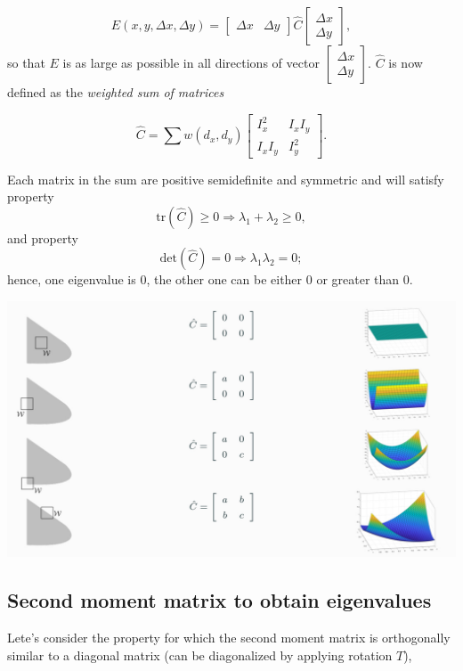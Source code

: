 \documentclass[10pt]{report}
\begin{document}
\[E(x, y, \Delta x, \Delta y) = \begin{bmatrix} \Delta x & \Delta y \end{bmatrix} \hat{C} \begin{bmatrix} \Delta x \\ \Delta y \end{bmatrix},\]
so that \(E\) is as large as possible in all directions of vector
\(\begin{bmatrix} \Delta x \\ \Delta y \end{bmatrix}\). \(\hat{C}\) is
now defined as the \emph{weighted sum of matrices}

\[\hat{C} = \sum w(d_x, d_y) \begin{bmatrix} I^2_x & I_x I_y \\ I_x I_y & I^2_y \end{bmatrix}.\]

Each matrix in the sum are positive semidefinite and symmetric and will
satisfy property
\[\mbox{tr}(\hat C) \geq 0 \Rightarrow \lambda_1 + \lambda_2 \geq 0,\]
and property
\[\mbox{det}(\hat C) = 0 \Rightarrow \lambda_1 \lambda_2 = 0;\] hence,
one eigenvalue is \(0\), the other one can be either \(0\) or greater
than \(0\).

\begin{center}
\includegraphics[width=.9\linewidth]{./pics/det/second-moment-matrix-plots.jpg}
\end{center}

\subsection{Second moment matrix to obtain eigenvalues}
\label{second-moment-matrix-to-obtain-eigenvalues}
Lete's consider the property for which the second moment matrix is
orthogonally similar to a diagonal matrix (can be diagonalized by
applying rotation \(T\)),
\end{document}
